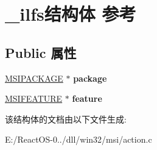 \hypertarget{struct__ilfs}{}\section{\+\_\+ilfs结构体 参考}
\label{struct__ilfs}
\subsection*{Public 属性}
\begin{DoxyCompactItemize}
\item 
\mbox{\label{struct__ilfs_a63d140bbf2c3f855378cb7e908efabea}} 
\hyperlink{structtag_m_s_i_p_a_c_k_a_g_e}{M\+S\+I\+P\+A\+C\+K\+A\+GE} $\ast$ {\bfseries package}
\item 
\mbox{\label{struct__ilfs_a1780f01708dbd234c4b479d2635892e6}} 
\hyperlink{structtag_m_s_i_f_e_a_t_u_r_e}{M\+S\+I\+F\+E\+A\+T\+U\+RE} $\ast$ {\bfseries feature}
\end{DoxyCompactItemize}


该结构体的文档由以下文件生成\+:\begin{DoxyCompactItemize}
\item 
E\+:/\+React\+O\+S-\/0../dll/win32/msi/action.\+c\end{DoxyCompactItemize}

